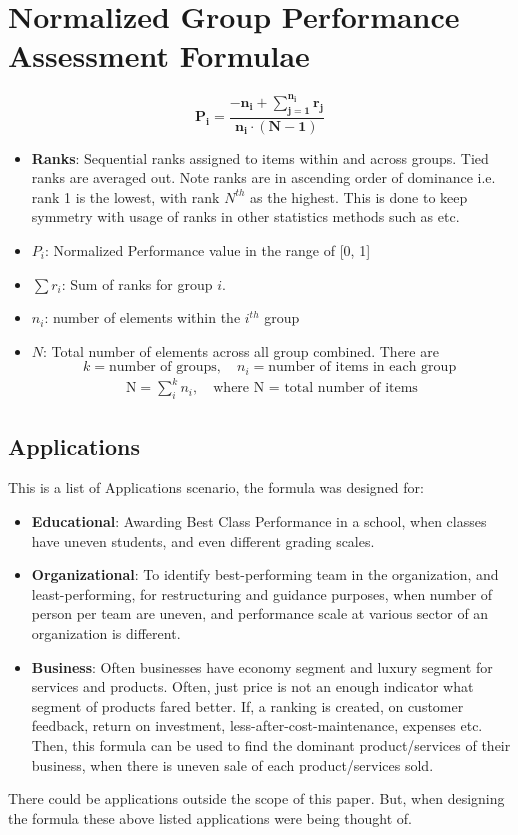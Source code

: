 \documentclass[man,floatsintext]{apa7}
\begin{document}
\section{Normalized Group Performance Assessment Formulae}


\begin{equation}
\boxed{
\mathbf{
P_i = \frac{-n_i +  \sum\limits_{j=1}^{n_i} r_j}{n_i \cdot (N - 1)}}
}
\end{equation}
   
\begin{itemize}
    \item \textbf{Ranks}: Sequential ranks assigned to items within and across groups. Tied ranks are averaged out. Note ranks are in ascending order of dominance i.e. rank 1 is the lowest, with rank $N^{th}$ as the highest. This is done to keep symmetry with usage of ranks in other statistics methods such as \cite{mann1947test} etc.
    \item \textbf{$P_i$}: Normalized Performance value in the range of [0, 1]
    \item \textbf{$\sum r_i$}: Sum of ranks for group $i$.
    \item \textbf{$n_i$}: number of elements within the $i^{th}$ group
    \item \textbf{$N$}: Total number of elements across all group combined. \hfill \break
    There are \[k = \text{number of groups}, \quad n_i = \text{number of items in each group }\]
    \begin{align}
        \text{N} = \sum\limits_i^k n_i, \quad \text{where N = total number of items}
    \end{align}

\end{itemize}

\subsection{Applications}
This is a list of Applications scenario, the formula was designed for:
\begin{itemize}
    \item \textbf{Educational}: Awarding Best Class Performance in a school, when classes have uneven students, and even different grading scales.
    \item \textbf{Organizational}: To identify best-performing team in the organization, and least-performing, for restructuring and guidance purposes, when number of person per team are uneven, and performance scale at various sector of an organization is different.
   \item \textbf{Business}: Often businesses have economy segment and luxury segment for services and products. Often, just price is not an enough indicator what segment of products fared better. If, a ranking is created, on customer feedback, return on investment, less-after-cost-maintenance, expenses etc. Then, this formula can be used to find the dominant product/services of their business, when there is uneven sale of each product/services sold.
\end{itemize}
There could be applications outside the scope of this paper. But, when designing the formula these above listed applications were being thought of.
\end{document}
